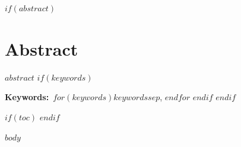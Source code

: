 \documentclass[english,12pt,a4paper,oneside]{article}
\begin{document}


$if(abstract)$
\section*{Abstract}
$abstract$
$if(keywords)$

\vspace{0.6em}\noindent\textbf{Keywords:}~$for(keywords)$$keywords$$sep$, $endfor$
$endif$
$endif$

$if(toc)$
\clearpage
\tableofcontents
$endif$

\clearpage
{}
\setcounter{page}{1}

$body$


\end{document}
